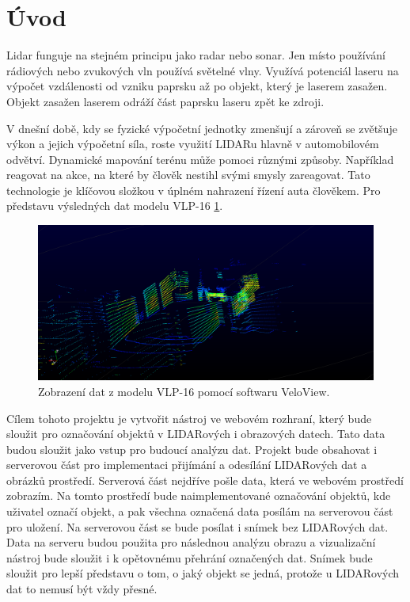 \documentclass[czech,bachelor,dept420,male,cpdeclaration]{diploma}
\begin{document}
\MakeTitlePages

\lstlistoflistings

\section{Úvod}
Lidar funguje na stejném principu jako radar nebo sonar. Jen místo používání rádiových nebo zvukových vln používá světelné vlny. Využívá potenciál laseru na výpočet vzdálenosti od vzniku paprsku až po objekt, který je laserem zasažen. Objekt zasažen laserem odráží část paprsku laseru zpět ke zdroji. 

V dnešní době, kdy se fyzické výpočetní jednotky zmenšují a zároveň se zvětšuje výkon a jejich výpočetní síla, roste využití LIDARu hlavně v automobilovém odvětví. Dynamické mapování terénu může pomoci různými způsoby. Například reagovat na akce, na které by člověk nestihl svými smysly zareagovat. Tato technologie je klíčovou složkou v úplném nahrazení řízení auta člověkem. Pro představu výsledných dat modelu VLP-16 \ref{fig:lidarexample}. 


\begin{figure}[H]
\includegraphics[width=\linewidth]{Figures/lidar_preview.png}
\caption{Zobrazení dat z modelu VLP-16 pomocí softwaru VeloView. }
\label{fig:lidarexample}
\end{figure}

Cílem tohoto projektu je vytvořit nástroj ve webovém rozhraní, který bude sloužit pro označování objektů v LIDARových i obrazových datech. Tato data budou sloužit jako vstup pro budoucí analýzu dat. Projekt bude obsahovat i serverovou část pro implementaci přijímání a odesílání LIDARových dat a obrázků prostředí. Serverová část nejdříve pošle data, která ve webovém prostředí zobrazím. Na tomto prostředí bude naimplementované označování objektů, kde uživatel označí objekt, a pak všechna označená data posílám na serverovou část pro uložení. Na serverovou část se bude posílat i snímek bez LIDARových dat. Data na serveru budou použita pro následnou analýzu obrazu a vizualizační nástroj bude sloužit i k opětovnému přehrání označených dat. Snímek bude sloužit pro lepší představu o tom, o jaký objekt se jedná, protože u LIDARových dat to nemusí být vždy přesné. 
\end{document}
